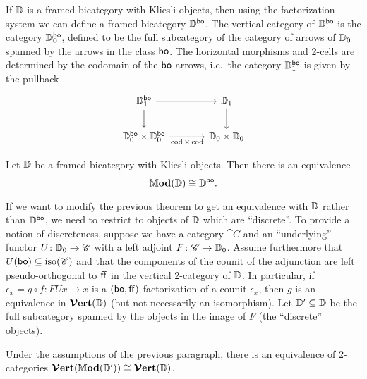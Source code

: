 \documentclass[12pt,oneside,article,draft]{memoir}
\begin{document}
If $\mathbb{D}$ is a framed bicategory with Kliesli objects, then using the factorization system we
can define a framed bicategory $\mathbb{D}^{\mathsf{bo}}$.  The vertical category of $\mathbb{D}^{\mathsf{bo}}$ is the
category $\mathbb{D}_0^{\mathsf{bo}}$, defined to be the full subcategory of the category of arrows of
$\mathbb{D}_0$ spanned by the arrows in the class $\mathsf{bo}$.  The horizontal morphisms and 2-cells are
determined by the codomain of the $\mathsf{bo}$ arrows, i.e.~the category $\mathbb{D}_1^{\mathsf{bo}}$ is given by the
pullback
\[
\begin{tikzcd}[column sep=large]
   \dcat{D}_1^{\bo} \ar[r] \ar[d] \ar[dr,phantom,"\lrcorner" very near start]
      & \dcat{D}_1 \ar[d] \\
   \dcat{D}_0^{\bo}\times\dcat{D}_0^{\bo} \ar[r,"\cod\times\cod"']
      & \dcat{D}_0\times\dcat{D}_0
\end{tikzcd}
\]

\begin{theorem}\label{thm:Mod vs bo}
   Let $\mathbb{D}$ be a framed bicategory with Kliesli objects. Then there is an equivalence
   \[
      \mathbb{M}\mathbf{od}(\mathbb{D}) \cong \mathbb{D}^{\mathsf{bo}}.
   \]
\end{theorem}

If we want to modify the previous theorem to get an equivalence with $\mathbb{D}$ rather than
$\mathbb{D}^{\mathsf{bo}}$, we need to restrict to objects of $\mathbb{D}$ which are ``discrete''.  To provide a
notion of discreteness, suppose we have a category $\cat{C}$ and an ``underlying'' functor
$U\colon\mathbb{D}_0\to\mathscr{C}$ with a left adjoint $F\colon\mathscr{C}\to\mathbb{D}_0$.  Assume furthermore
that $U(\mathsf{bo})\subseteq\mathrm{iso}(\mathscr{C})$ and that the components of the counit of the adjunction
are left pseudo-orthogonal to $\mathsf{ff}$ in the vertical 2-category of $\mathbb{D}$.  In particular, if
$\epsilon_x=g\circ f\colon FUx\to x$ is a $(\mathsf{bo},\mathsf{ff})$ factorization of a counit $\epsilon_x$, then
$g$ is an equivalence in $\bm{\mathcal{V}}\mathbf{ert}(\mathbb{D})$ (but not necessarily an isomorphism).  Let
$\mathbb{D}'\subseteq\mathbb{D}$ be the full subcategory spanned by the objects in the image of $F$ (the
``discrete'' objects).

\begin{theorem}\label{thm:Verts}
   Under the assumptions of the previous paragraph, there is an equivalence of 2-categories
   $\bm{\mathcal{V}}\mathbf{ert}(\mathbb{M}\mathbf{od}(\mathbb{D}'))\cong\bm{\mathcal{V}}\mathbf{ert}(\mathbb{D})$.
\end{theorem}
\end{document}
